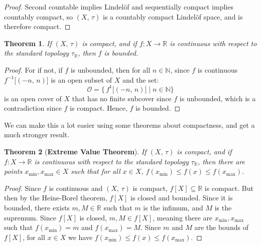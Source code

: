 \documentclass{article}
\theoremstyle{plain}
\newtheorem{theorem}{Theorem}[section]
\theoremstyle{normal}
\begin{document}
        \begin{proof}
            Second countable implies Lindel\"{o}f and sequentially compact
            implies countably compact, so $(X,\,\tau)$ is a countably compact
            Lindel\"{o}f space, and is therefore compact.
        \end{proof}
        \begin{theorem}
            If $(X,\,\tau)$ is compact, and if $f:X\rightarrow\mathbb{R}$ is
            continuous with respect to the standard topology
            $\tau_{\mathbb{R}}$, then $f$ is bounded.
        \end{theorem}
        \begin{proof}
            For if not, if $f$ is unbounded, then for all $n\in\mathbb{N}$,
            since $f$ is continuous
            $f^{-1}\big[(-n,\,n)]$ is an open subset of $X$ and the set:
            \begin{equation}
                \mathcal{O}=\Big\{\,f^{1}\big[(-n,\,n)\big]\;|\;n\in\mathbb{N}
                    \Big\}
            \end{equation}
            is an open cover of $X$ that has no finite subcover since $f$ is
            unbounded, which is a contradiction since $f$ is compact. Hence,
            $f$ is bounded.
        \end{proof}
        We can make this a lot easier using some theorems about compactness, and
        get a much stronger result.
        \begin{theorem}[\textbf{Extreme Value Theorem}]
            If $(X,\,\tau)$ is compact, and if $f:X\rightarrow\mathbb{R}$ is
            continuous with respect to the standard topology
            $\tau_{\mathbb{R}}$, then there are points
            $x_{\textrm{min}},x_{\textrm{max}}\in{X}$ such that for all
            $x\in{X}$, $f(x_{\textrm{min}})\leq{f}(x)\leq{f}(x_{\textrm{max}})$.
        \end{theorem}
        \begin{proof}
            Since $f$ is continuous and $(X,\,\tau)$ is compact,
            $f[X]\subseteq\mathbb{R}$ is compact. But then by the Heine-Borel
            theorem, $f[X]$ is closed and bounded. Since it is bounded, there
            exists $m,M\in\mathbb{R}$ such that $m$ is the infimum, and
            $M$ is the supremum. Since $f[X]$ is closed, $m,M\in{f}[X]$, meaning
            there are $x_{\textrm{min}},x_{\textrm{max}}$ such that
            $f(x_{\textrm{min}})=m$ and $f(x_{\textrm{max}})=M$. Since
            $m$ and $M$ are the bounds of $f[X]$, for all
            $x\in{X}$ we have
            $f(x_{\textrm{min}})\leq{f}(x)\leq{f}(x_{\textrm{max}})$.
        \end{proof}
\end{document}
